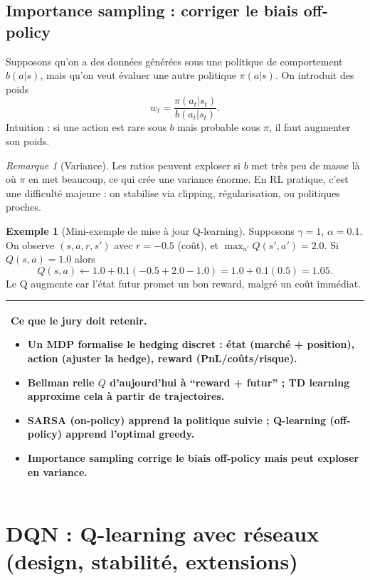 \documentclass[11pt,a4paper]{report}
\newcommand{\1}{\mathbbm{1}}
\theoremstyle{definition}
\newtheorem{example}{Exemple}[chapter]
\theoremstyle{plain}
\theoremstyle{remark}
\newtheorem{remark}{Remarque}[chapter]
\newenvironment{jurybox}{%
  \begin{center}
  \setlength{\tabcolsep}{6pt}%
  \renewcommand{\arraystretch}{1.1}%
  \begin{tabular}{|p{0.94\textwidth}|}
  \hline
  \small\textbf{Ce que le jury doit retenir.}\par\medskip
}{%
  \\ \hline
  \end{tabular}
  \end{center}
}
\begin{document}
\section{Importance sampling : corriger le biais off-policy}
\label{sec:is}

Supposons qu'on a des données générées sous une politique de comportement $b(a|s)$,
mais qu'on veut évaluer une autre politique $\pi(a|s)$.
On introduit des poids
\[
w_t = \frac{\pi(a_t|s_t)}{b(a_t|s_t)}.
\]
Intuition : si une action est rare sous $b$ mais probable sous $\pi$, il faut augmenter son poids.

\begin{remark}[Variance]
Les ratios peuvent exploser si $b$ met très peu de masse là où $\pi$ en met beaucoup,
ce qui crée une variance énorme.
En RL pratique, c'est une difficulté majeure : on stabilise via clipping, régularisation, ou politiques proches.
\end{remark}

\begin{example}[Mini-exemple de mise à jour Q-learning]
Supposons $\gamma=1$, $\alpha=0.1$.
On observe $(s,a,r,s')$ avec $r=-0.5$ (coût), et $\max_{a'}Q(s',a')=2.0$.
Si $Q(s,a)=1.0$ alors
\[
Q(s,a)\leftarrow 1.0 + 0.1(-0.5 + 2.0 - 1.0)=1.0 + 0.1(0.5)=1.05.
\]
Le Q augmente car l'état futur promet un bon reward, malgré un coût immédiat.
\end{example}

\begin{jurybox}
\begin{itemize}
\item Un MDP formalise le hedging discret : état (marché + position), action (ajuster la hedge), reward (PnL/coûts/risque).
\item Bellman relie $Q$ d'aujourd'hui à ``reward + futur'' ; TD learning approxime cela à partir de trajectoires.
\item SARSA (on-policy) apprend la politique suivie ; Q-learning (off-policy) apprend l'optimal greedy.
\item Importance sampling corrige le biais off-policy mais peut exploser en variance.
\end{itemize}
\end{jurybox}

\chapter{DQN : Q-learning avec réseaux (design, stabilité, extensions)}
\label{chap:dqn}
\end{document}
